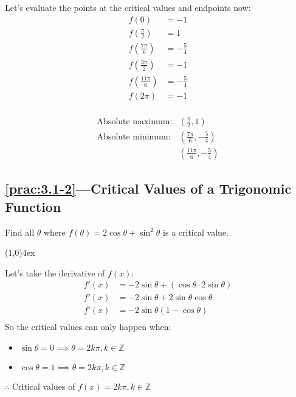 \documentclass{MathNotes}
\newcommand{\br}{
\begin{center}
\line(1,0){4ex}
\end{center}}
\begin{document}
Let's evaluate the points at the critical values and endpoints now:
\begin{align*}
    f(0)&=-1\\
    f(\frac{\pi}{2})&=1\\
    f(\frac{7\pi}{6})&=-\frac{5}{4}\\
    f(\frac{3\pi}{2})&=-1\\
    f(\frac{11\pi}{6})&=-\frac{5}{4}\\
    f(2\pi)&=-1\\
\end{align*}

\begin{align*}
    \text{Absolute maximum:}& (\frac{\pi}{2}, 1)\\
    \text{Absolute minimum:}& (\frac{7\pi}{6}, -\frac{5}{4})\\
                            & (\frac{11\pi}{6}, -\frac{5}{4})
\end{align*}

\subsection*{\ref{prac:3.1-2}---Critical Values of a Trigonomic Function}
\label{ans:3.1-2}
Find all $\theta$ where $\displaystyle f(\theta)=2\cos\theta+\sin^2\theta$
is a critical value.
\br
Let's take the derivative of $f(x)$:
\begin{align*}
    f'(x)&=-2\sin\theta+(\cos\theta\cdot 2\sin\theta)\\
    f'(x)&=-2\sin\theta+2\sin\theta\cos\theta\\
    f'(x)&=-2\sin\theta(1 - \cos\theta)\\
\end{align*}
So the critical values can only happen when:
\begin{multicols}{2}
    \begin{itemize}
        \item $\sin\theta=0\implies\theta=2k\pi,k\in\mathbb{Z}$
        \item $\cos\theta=1\implies\theta=2k\pi,k\in\mathbb{Z}$
    \end{itemize}
\end{multicols}
$\therefore$ Critical values of $f(x)=2k\pi,k\in\mathbb{Z}$ 

\newpage
\end{document}
